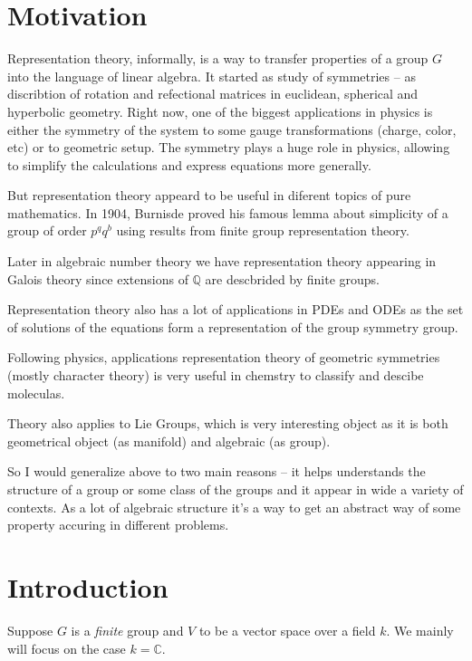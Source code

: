 \documentclass{amsart}
\author{M. Tikhonov}
\begin{document}
\newtheorem{definition}{Definition}
\newtheorem{note}{Note}
\newtheorem{lemma}{Lemma}

\section{Motivation}

Representation theory, informally, is a way to transfer properties of a group $G$  into the language of linear algebra. 
It started as study of symmetries -- as discribtion of rotation and refectional matrices in euclidean, spherical and hyperbolic geometry. 
Right now, one of the biggest applications in physics is either the symmetry of the system to some gauge transformations (charge, color, etc) or to geometric setup. 
The symmetry plays a huge role in physics, allowing to simplify the calculations and express equations more generally.

But representation theory appeard to be useful in diferent topics of pure mathematics.  
In 1904, Burnisde proved his famous lemma about simplicity of a group of order $p^q q^b$ using results from finite group representation theory.

Later in algebraic number theory we have representation theory appearing in Galois theory since extensions of $\mathbb{Q}$ are descbrided by finite groups.

Representation theory also has a lot of applications in PDEs and ODEs as the set of solutions of the equations form a representation of the group symmetry group.

Following physics, applications representation theory of geometric symmetries (mostly character theory) is very useful in chemstry to classify and descibe moleculas.

Theory also applies to Lie Groups, which is very interesting object as it is both geometrical object (as manifold) and algebraic (as group).

So I would generalize above to two main reasons -- it helps understands the structure of a group or some class of the groups and it appear in wide a variety of contexts.
As a lot of algebraic structure it's a way to get an abstract way of some property accuring in different problems.
\section{Introduction}

Suppose $G$ is a \textit{finite} group and $V$ to be a vector space over a field $k$. We mainly will focus on the case $k=\mathbb{C}$.
\end{document}

